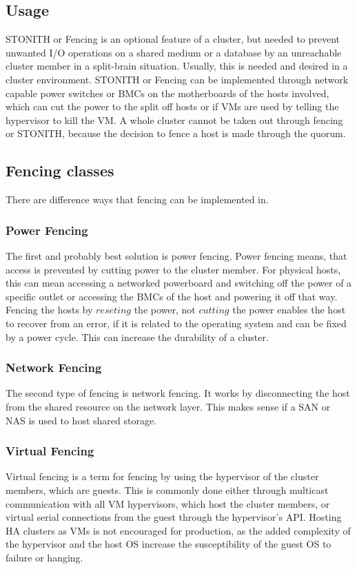 \subsection{Usage}
STONITH or Fencing is an optional feature of a cluster, but needed
to prevent unwanted I/O operations on a shared medium or a database
by an unreachable cluster member in a split-brain situation. Usually, this is needed
and desired in a cluster environment. STONITH or Fencing can be implemented
through network capable power switches or \acp{BMC} on the motherboards
of the hosts involved, which can cut the power to the split off hosts or
if \acp{VM} are used by telling the hypervisor to kill the \ac{VM}.
A whole cluster cannot be taken out through fencing or \ac{STONITH}, because
the decision to fence a host is made through the quorum.
\subsection{Fencing classes}
There are difference ways that fencing can be implemented in.
\subsubsection{Power Fencing}
The first and probably best solution is power fencing.
Power fencing means, that access is prevented by cutting power to the cluster member.
For physical hosts, this can mean accessing a networked powerboard and switching
off the power of a specific outlet or accessing the \acp{BMC} of the host
and powering it off that way. Fencing the hosts by $reseting$ the power, not $cutting$
the power enables the host to recover from an error, if it is related to the operating
system and can be fixed by a power cycle. This can increase the durability of a cluster.
\subsubsection{Network Fencing}
The second type of fencing is network fencing. It works by disconnecting the host
from the shared resource on the network layer. This makes sense if a \ac{SAN} or \ac{NAS}
is used to host shared storage.
\subsubsection{Virtual Fencing}
Virtual fencing is a term for fencing by using the hypervisor of the cluster members,
which are guests. This is commonly done either through multicast communication with all
\ac{VM} hypervisors, which host the cluster members, or virtual serial connections
from the guest through the hypervisor's \ac{API}. Hosting \ac{HA} clusters
as \acp{VM} is not encouraged for production, as the added complexity of the hypervisor
and the host \ac{OS} increase the susceptibility of the guest \ac{OS} to failure
or hanging.

